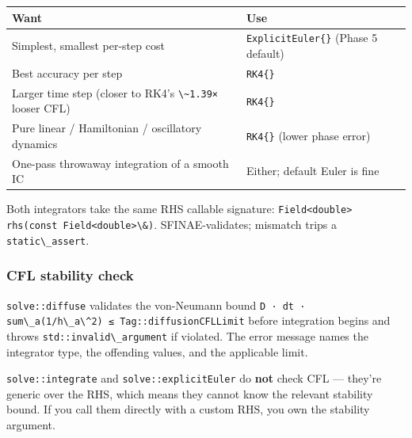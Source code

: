 {\def\LTcaptype{none} %
\begin{longtable}[]{@{}
  >{\raggedright\arraybackslash}p{}
  >{\raggedright\arraybackslash}p{}@{}}
\toprule\noalign{}
\begin{minipage}[b]{\linewidth}\raggedright
Want
\end{minipage} & \begin{minipage}[b]{\linewidth}\raggedright
Use
\end{minipage} \\
\midrule\noalign{}
\endhead
\bottomrule\noalign{}
\endlastfoot
Simplest, smallest per-step cost &
\passthrough{\lstinline!ExplicitEuler\{\}!} (Phase 5 default) \\
Best accuracy per step & \passthrough{\lstinline!RK4\{\}!} \\
Larger time step (closer to RK4's \passthrough{\lstinline!\~1.39×!}
looser CFL) & \passthrough{\lstinline!RK4\{\}!} \\
Pure linear / Hamiltonian / oscillatory dynamics &
\passthrough{\lstinline!RK4\{\}!} (lower phase error) \\
One-pass throwaway integration of a smooth IC & Either; default Euler is
fine \\
\end{longtable}
}

Both integrators take the same RHS callable signature:
\passthrough{\lstinline!Field<double> rhs(const Field<double>\&)!}.
SFINAE-validates; mismatch trips a
\passthrough{\lstinline!static\_assert!}.

\subsubsection{CFL stability check}\label{cfl-stability-check}

\passthrough{\lstinline!solve::diffuse!} validates the von-Neumann bound
\passthrough{\lstinline!D · dt · sum\_a(1/h\_a\^2) ≤ Tag::diffusionCFLLimit!}
before integration begins and throws
\passthrough{\lstinline!std::invalid\_argument!} if violated. The error
message names the integrator type, the offending values, and the
applicable limit.

\passthrough{\lstinline!solve::integrate!} and
\passthrough{\lstinline!solve::explicitEuler!} do \textbf{not} check CFL
--- they're generic over the RHS, which means they cannot know the
relevant stability bound. If you call them directly with a custom RHS,
you own the stability argument.

